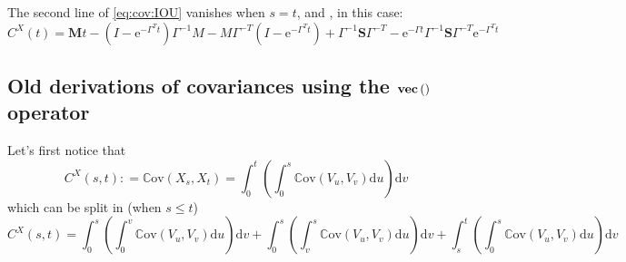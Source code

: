 \documentclass[10pt,a4paper]{article}
\newcommand{\rmd}{\text{d}}
\newcommand{\Cov}{\mathbb{C}\text{ov}}
\newcommand{\e}{\text{e}}
\newcommand{\inv}{^{-1}}
\newcommand{\Vect}[1]{\textbf{vec}\left(#1 \right)}
\newcommand{\Sinf}{\mathbf{S}}
\newcommand{\M}{\mathbf{M}}
\begin{document}
The second line of \eqref{eq:cov:IOU} vanishes when $s = t$, and , in this case:
$$C^X(t) = \M t - \left(I - \e^{-\Gamma^T t}\right)\Gamma\inv M - M\Gamma^{-T}\left(I - \e^{-\Gamma^T t}\right)+ \Gamma\inv \Sinf \Gamma^{-T} - 
   \e^{-\Gamma t}\Gamma\inv\Sinf\Gamma^{-T}\e^{-\Gamma^T t}$$

\subsection{Old derivations of covariances using the $\Vect{\hbox{}}$ operator}

Let's first notice that
$$C^X(s,t) : =  \Cov(X_s, X_t)  = \int_0^t \left( \int_0^s \Cov(V_u, V_v) \rmd u \right) \rmd v$$
which can be split in (when $s\leq t$)
$$C^X(s,t) = \int_0^s \left( \int_0^v \Cov(V_u, V_v) \rmd u \right) \rmd v + \int_0^s \left( \int_v^s \Cov(V_u, V_v) \rmd u \right) \rmd v + \int_s^t \left( \int_0^s \Cov(V_u, V_v) \rmd u \right) \rmd v$$
\end{document}
